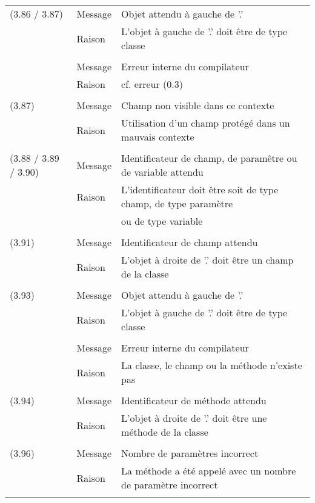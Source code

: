 \documentclass[11pt]{article}
\begin{document}
      \begin{tabular}{lll}
      (3.86 / 3.87) & Message & Objet attendu à gauche de '.'\\
      & Raison & L'objet à gauche de '.' doit être de type classe\\
      \\
      & Message & Erreur interne du compilateur\\
      & Raison & cf. erreur (0.3) \\
      \\
      (3.87) & Message & Champ non visible dans ce contexte\\
      & Raison & Utilisation d'un champ protégé dans un mauvais contexte\\
      \\
      (3.88 / 3.89 / 3.90) & Message & Identificateur de champ, de paramêtre ou de variable attendu\\
      & Raison & L'identificateur doit être soit de type champ, de type paramètre \\
      && ou de type variable\\
      \\      
      (3.91) & Message & Identificateur de champ attendu\\
      & Raison & L'objet à droite de '.' doit être un champ de la classe\\
      \\
      (3.93) & Message & Objet attendu à gauche de '.'\\
      & Raison & L'objet à gauche de '.' doit être de type classe\\
      \\
      & Message & Erreur interne du compilateur\\
      & Raison & La classe, le champ ou la méthode n'existe pas\\
      \\
      (3.94) & Message & Identificateur de méthode attendu\\
      & Raison & L'objet à droite de '.' doit être une méthode de la classe\\
      \\
      (3.96) & Message & Nombre de paramètres incorrect\\ 
      & Raison & La méthode a été appelé avec un nombre de paramètre incorrect\\
      \\
      \end{tabular}
\end{document}
